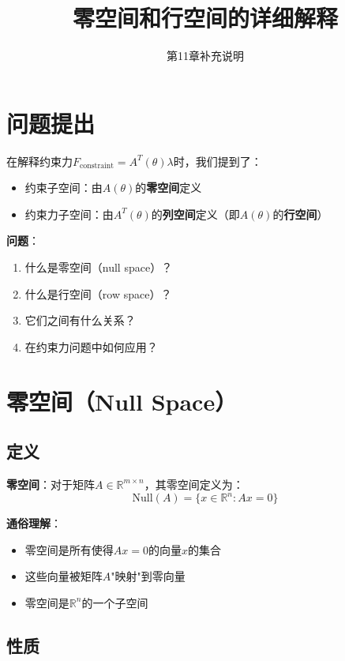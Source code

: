 \documentclass[12pt,a4paper]{article}
\title{零空间和行空间的详细解释}
\author{第11章补充说明}
\date{}
\begin{document}
\maketitle

\section{问题提出}

在解释约束力$F_{\text{constraint}} = A^T(\theta)\lambda$时，我们提到了：
\begin{itemize}
\item 约束子空间：由$A(\theta)$的\textbf{零空间}定义
\item 约束力子空间：由$A^T(\theta)$的\textbf{列空间}定义（即$A(\theta)$的\textbf{行空间}）
\end{itemize}

\textbf{问题}：
\begin{enumerate}
\item 什么是零空间（null space）？
\item 什么是行空间（row space）？
\item 它们之间有什么关系？
\item 在约束力问题中如何应用？
\end{enumerate}

\section{零空间（Null Space）}

\subsection{定义}

\textbf{零空间}：对于矩阵$A \in \mathbb{R}^{m \times n}$，其零空间定义为：
\begin{equation}
\text{Null}(A) = \{x \in \mathbb{R}^n : Ax = 0\}
\end{equation}

\textbf{通俗理解}：
\begin{itemize}
\item 零空间是所有使得$Ax = 0$的向量$x$的集合
\item 这些向量被矩阵$A$"映射"到零向量
\item 零空间是$\mathbb{R}^n$的一个子空间
\end{itemize}

\subsection{性质}
\end{document}
